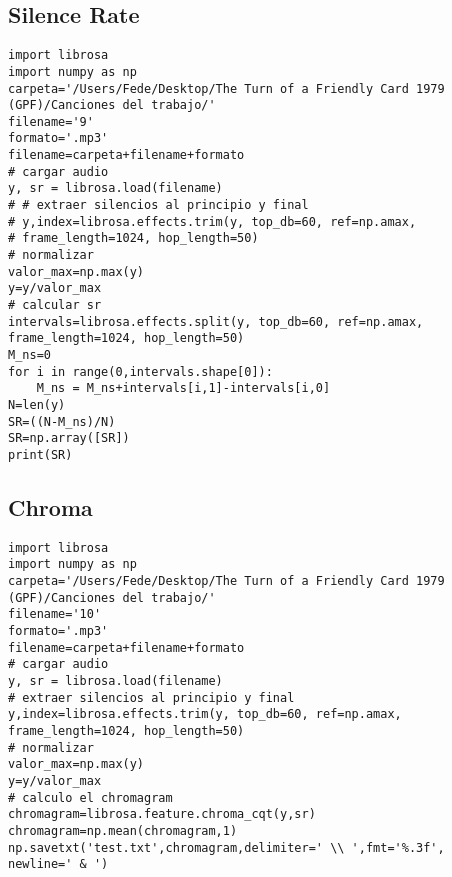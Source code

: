 \documentclass[]{article}
\begin{document}
\subsection{Silence Rate}
\label{silence rate}
\begin{verbatim}
import librosa
import numpy as np
carpeta='/Users/Fede/Desktop/The Turn of a Friendly Card 1979 (GPF)/Canciones del trabajo/'
filename='9'
formato='.mp3'
filename=carpeta+filename+formato
# cargar audio
y, sr = librosa.load(filename)
# # extraer silencios al principio y final
# y,index=librosa.effects.trim(y, top_db=60, ref=np.amax,
# frame_length=1024, hop_length=50)
# normalizar
valor_max=np.max(y)
y=y/valor_max
# calcular sr
intervals=librosa.effects.split(y, top_db=60, ref=np.amax,
frame_length=1024, hop_length=50)
M_ns=0
for i in range(0,intervals.shape[0]):
    M_ns = M_ns+intervals[i,1]-intervals[i,0]
N=len(y)
SR=((N-M_ns)/N)
SR=np.array([SR])
print(SR)
\end{verbatim}

\subsection{Chroma}
\label{chroma}
\begin{verbatim}
import librosa
import numpy as np
carpeta='/Users/Fede/Desktop/The Turn of a Friendly Card 1979 (GPF)/Canciones del trabajo/'
filename='10'
formato='.mp3'
filename=carpeta+filename+formato
# cargar audio
y, sr = librosa.load(filename)
# extraer silencios al principio y final
y,index=librosa.effects.trim(y, top_db=60, ref=np.amax,
frame_length=1024, hop_length=50)
# normalizar
valor_max=np.max(y)
y=y/valor_max
# calculo el chromagram
chromagram=librosa.feature.chroma_cqt(y,sr)
chromagram=np.mean(chromagram,1)
np.savetxt('test.txt',chromagram,delimiter=' \\ ',fmt='%.3f', newline=' & ')
\end{verbatim}
\end{document}
